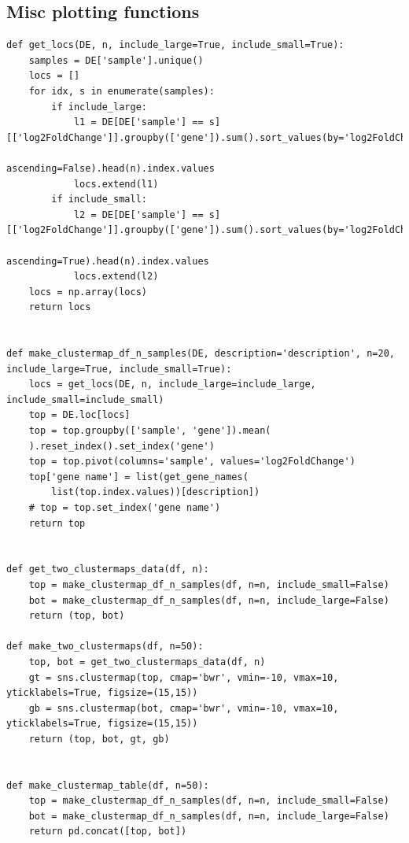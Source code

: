 \documentclass[11pt]{article}
\begin{document}
\subsection{Misc plotting functions}
\label{sec:org15ad12f}

\begin{verbatim}
def get_locs(DE, n, include_large=True, include_small=True):
    samples = DE['sample'].unique()
    locs = []
    for idx, s in enumerate(samples):
        if include_large:
            l1 = DE[DE['sample'] == s][['log2FoldChange']].groupby(['gene']).sum().sort_values(by='log2FoldChange',
                                                                                               ascending=False).head(n).index.values
            locs.extend(l1)
        if include_small:
            l2 = DE[DE['sample'] == s][['log2FoldChange']].groupby(['gene']).sum().sort_values(by='log2FoldChange',
                                                                                               ascending=True).head(n).index.values
            locs.extend(l2)
    locs = np.array(locs)
    return locs


def make_clustermap_df_n_samples(DE, description='description', n=20, include_large=True, include_small=True):
    locs = get_locs(DE, n, include_large=include_large, include_small=include_small)
    top = DE.loc[locs]
    top = top.groupby(['sample', 'gene']).mean(
    ).reset_index().set_index('gene')
    top = top.pivot(columns='sample', values='log2FoldChange')
    top['gene name'] = list(get_gene_names(
        list(top.index.values))[description])
    # top = top.set_index('gene name')
    return top


def get_two_clustermaps_data(df, n):
    top = make_clustermap_df_n_samples(df, n=n, include_small=False)
    bot = make_clustermap_df_n_samples(df, n=n, include_large=False)
    return (top, bot)

def make_two_clustermaps(df, n=50):
    top, bot = get_two_clustermaps_data(df, n)
    gt = sns.clustermap(top, cmap='bwr', vmin=-10, vmax=10, yticklabels=True, figsize=(15,15))
    gb = sns.clustermap(bot, cmap='bwr', vmin=-10, vmax=10, yticklabels=True, figsize=(15,15))
    return (top, bot, gt, gb)


def make_clustermap_table(df, n=50):
    top = make_clustermap_df_n_samples(df, n=n, include_small=False)
    bot = make_clustermap_df_n_samples(df, n=n, include_large=False)
    return pd.concat([top, bot])
\end{verbatim}
\end{document}
